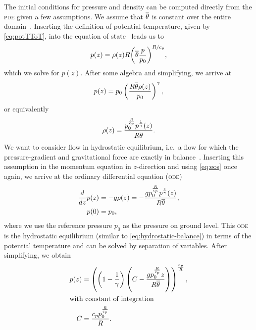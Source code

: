 The initial conditions for pressure and density can be computed directly from the \textsc{pde} given a few assumptions.
We assume that $\overline{\theta}$ is constant over the entire domain~\cite{giraldo2008study}.
Inserting the definition of potential temperature, given by \cref{eq:potTToT}, into the equation of state~ leads us to
\begin{equation}
  p(z) = \rho(z) R {\left( \overline{\theta} \frac{p}{p_0}\right)}^{R/c_p},
\end{equation}
which we solve for $p(z)$.
After some algebra and simplifying, we arrive at
\begin{equation}
 p(z) = p_0 \left( \frac{R \overline{\theta} \rho(z)}{p_0} \right)^{\gamma},
\end{equation}
or equivalently
\begin{equation}
  \label{eq:eos-potT}
\rho(z) = \frac{p_{0}^{\frac{R}{c_{p}}} p^{\frac{1}{\gamma}}{\left (z \right )}}{R \overline{\theta}}.
\end{equation}
We want to consider flow in hydrostatic equilibrium, i.e.\ a flow for which the pressure-gradient and gravitational force are exactly in balance~\cite{muller2010adaptive}.
Inserting this assumption in the momentum equation in $z$-direction and using \cref{eq:eos} once again, we arrive at the ordinary differential equation (\textsc{ode})
\begin{align}
  \label{eq:hydrostatic-balance-potT}
  \begin{split}
  \frac{d}{d z} p{\left (z \right )} &= -g \rho(z)
                                     = 
        - \frac{g p_{0}^{\frac{R}{c_{p}}} p^{\frac{1}{\gamma}}{\left (z \right )}}{R \overline{\theta}},\\
  p{\left (0 \right )} &= p_0,
  \end{split}
\end{align}
where we use the reference pressure $p_0$ as the pressure on ground level.
This \textsc{ode} is the hydrostatic equilibrium (similar to \cref{eq:hydrostatic-balance}) in terms of the potential temperature and can be solved by separation of variables.
After simplifying, we obtain
\begin{align}
  \label{eq:hydrostatic-background-pressure}
p(z) &= \left(\left(1 - \frac{1}{\gamma}\right) \left(C - \frac{g p_{0}^{\frac{R}{c_{p}}} z}{R \overline{\theta}}\right)\right)^{\frac{c_{p}}{R}},\\
\shortintertext{with constant of integration}
 C &= \frac{c_{p} p_{0}^{\frac{R}{c_{p}}}}{R}.
\end{align}

